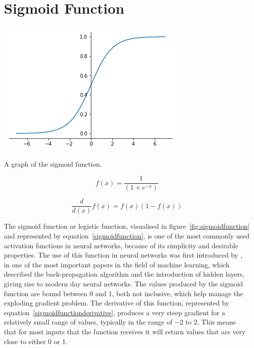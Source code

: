 \section{Sigmoid Function}\label{sec:sigmoid}

\begin{marginfigure}
  \includegraphics{graphics/activation_functions/sigmoid_function.png}
  \caption{
    A graph of the sigmoid function.
  }
  \label{fig:sigmoidfunction}
\end{marginfigure}

\begin{equation}\label{sigmoidfunction}
    f(x) = \frac{1}{(1 + e^{-x})}
\end{equation}

\begin{equation}\label{sigmoidfunctionderivative}
    \frac{d}{d(x)}f(x) = f(x)(1-f(x))
\end{equation}

The sigmoid function or logistic function, visualised in figure~\ref{fig:sigmoidfunction} and represented by  equation~\ref{sigmoidfunction}, is one of the most commonly used activation functions in neural networks, because of its simplicity and desirable properties. The use of this function in neural networks was first introduced by \citet{DavidE.Rumelhart1986Lrbb}, in one of the most important papers in the field of machine learning, which described the back-propagation algorithm and the introduction of hidden layers, giving rise to modern day neural networks.  The values produced by the sigmoid function are bound between 0 and 1, both not inclusive, which help manage the exploding gradient problem. The derivative of this function, represented by equation~\ref{sigmoidfunctionderivative}, produces a very steep gradient for a relatively small range of values, typically in the range of $-2$ to $2$. This means that for most inputs that the function receives it will return values that are very close to either 0 or 1.

